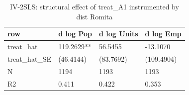 \begin{table}

\caption{IV-2SLS: structural effect of treat_A1 instrumented by dist Romita}
\centering
\begin{tabular}[t]{llll}
\toprule
row & d log Pop & d log Units & d log Emp\\
\midrule
treat\_hat & 119.2629** & 56.5455 & -13.1070\\
treat\_hat\_SE & (46.4144) & (83.7692) & (109.4904)\\
N & 1194 & 1193 & 1193\\
R2 & 0.411 & 0.422 & 0.353\\
\bottomrule
\end{tabular}
\end{table}
